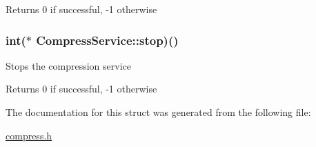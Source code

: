 \begin{DoxyReturn}{\-Returns}
0 if successful, -\/1 otherwise 
\end{DoxyReturn}
\hypertarget{structCompressService_a14b29cd7fd8ed18555749fbbeda609b9}{
\subsubsection[{stop}]{\setlength{\rightskip}{0pt plus 5cm}int($\ast$ {\bf \-Compress\-Service\-::stop})()}}\label{structCompressService_a14b29cd7fd8ed18555749fbbeda609b9}
\-Stops the compression service \begin{DoxyReturn}{\-Returns}
0 if successful, -\/1 otherwise 
\end{DoxyReturn}


\-The documentation for this struct was generated from the following file\-:\begin{DoxyCompactItemize}
\item 
\hyperlink{compress_8h}{compress.\-h}\end{DoxyCompactItemize}
